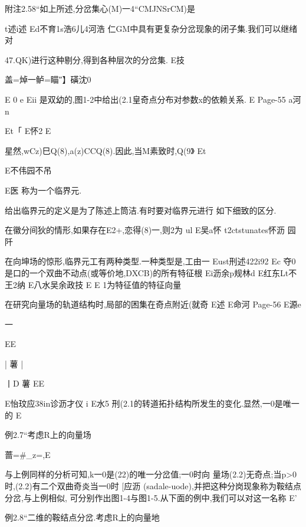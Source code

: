 附注2.58“如上所述,分岔集心(M)一4“CMJNSrCM)是

t述i述
Ed不育1s浩6儿4河浩
仁GM中具有更复杂分岔现象的闭子集.我们可以继绪对

47.QK)进行这种剔分,得到各种层次的分岔集.
E技

盖=焯一鲈=瞄″】磺沈0

E
0
e
Eii
是双幼的,图1-2中给出(2.1皇奇点分布对参数x的依赖关系.
E
Page-55
a河n

Et「
E怀2
E

星然,wCz)巳Q(8),a(z)CCQ(8).因此,当M素致时,Q(9》
Et

E不伟园不吊

E医
称为一个临界元.

给出临界元的定义是为了陈述上筒洁.有时要对临界元进行
如下细致的区分.

在徽分间狄的情形,如果存在E2+,恋得(8)一,则2为
ul
E吴a怀
t2ctstunates怀沥
园阡

在向坤场的惊形,临界元工有两种类型.一种类型是,工由一
Eust刑述422i92
Ec
夺0是口的一个双曲不动点(或等价地,DXCB)的所有特征根
Ei沥余p规林d
E红东Lt不王2纳
E八水吴余政技
E
E
1为特征值的特征向量

在研究向量场的轨道结构时,局部的困集在奇点附近(就奇
E述
E命河
Page-56
E源e

一

EE

|
薯
|

丨D
薯
EE

E怡玟应38in诊沥才仪
i
E水5
刑(2.1的转道拓扑结构所发生的变化.显然,一0是唯一的
E

例2.7“考虑R上的向量场

蔷=#_z=,E

与上例同样的分析可知,k一0是(22)的唯一分岔值;一0时向
量场(2.2)无奇点;当p>0时,(2.2)有二个双曲奇炎当一0时
[应沥
(sadale-uode),并把这种分岗现象称为鞍结点分岔,与上例相似,
可分别作出图1-4与图1-5.从下面的例中,我们可以对这一名称
E'

例2.8“二维的鞍结点分岔.考虑R上的向量地

